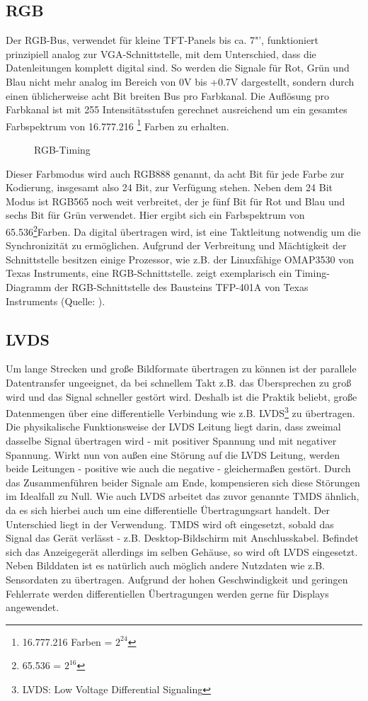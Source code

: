 \subsection{RGB}
Der RGB-Bus, verwendet für kleine TFT-Panels bis ca. 7"', funktioniert prinzipiell analog zur VGA-Schnittstelle, mit dem Unterschied, dass die Datenleitungen komplett digital sind. 
So werden die Signale für Rot, Grün und Blau nicht mehr analog im Bereich von 0V bis +0.7V dargestellt, sondern durch einen üblicherweise acht Bit breiten Bus pro Farbkanal. Die Auflösung pro Farbkanal ist mit 255 Intensitätsstufen gerechnet ausreichend um ein gesamtes Farbspektrum von 16.777.216 \footnote{16.777.216 Farben = $2^{24}$} Farben zu erhalten. 
\begin{figure}[htp]
	\centering
{}
	\caption{RGB-Timing}
	\label{fig:rgb_timing}
\end{figure}
Dieser Farbmodus wird auch RGB888 genannt, da acht Bit für jede Farbe zur Kodierung, insgesamt also 24 Bit, zur Verfügung stehen. Neben dem 24 Bit Modus ist RGB565 noch weit verbreitet, der je fünf Bit für Rot und Blau und sechs Bit für Grün verwendet. Hier ergibt sich ein Farbspektrum von 65.536\footnote{65.536 = $2^{16}$}Farben. Da digital übertragen wird, ist eine Taktleitung notwendig um die Synchronizität zu ermöglichen. 
Aufgrund der Verbreitung und Mächtigkeit der Schnittstelle besitzen einige Prozessor, wie z.B. der Linuxfähige OMAP3530 von Texas Instruments, eine RGB-Schnittstelle. 
 zeigt exemplarisch ein Timing-Diagramm der RGB-Schnittstelle des Bausteins TFP-401A von Texas Instruments (Quelle: \cite{TI2011}).
\subsection{LVDS}
Um lange Strecken und große Bildformate übertragen zu können ist der parallele Datentransfer ungeeignet, da bei schnellem Takt z.B. das Übersprechen zu groß wird und das Signal schneller gestört wird. Deshalb ist die Praktik beliebt, große Datenmengen über eine differentielle Verbindung wie z.B. LVDS\footnote{LVDS: Low Voltage Differential Signaling} zu übertragen. Die physikalische Funktionsweise der LVDS Leitung liegt darin, dass zweimal dasselbe Signal übertragen wird - mit positiver Spannung und mit negativer Spannung. Wirkt nun von außen eine Störung auf die LVDS Leitung, werden beide Leitungen - positive wie auch die negative - gleichermaßen gestört. Durch das Zusammenführen beider Signale am Ende, kompensieren sich diese Störungen im Idealfall zu Null. Wie auch LVDS arbeitet das zuvor genannte TMDS ähnlich, da es sich hierbei auch um eine differentielle Übertragungsart handelt. Der Unterschied liegt in der Verwendung. TMDS wird oft eingesetzt, sobald das Signal das Gerät verlässt - z.B. Desktop-Bildschirm mit Anschlusskabel. Befindet sich das Anzeigegerät allerdings im selben Gehäuse, so wird oft LVDS eingesetzt. Neben Bilddaten ist es natürlich auch möglich andere Nutzdaten wie z.B. Sensordaten zu übertragen. 
Aufgrund der hohen Geschwindigkeit und geringen Fehlerrate werden differentiellen Übertragungen werden gerne für Displays angewendet.
